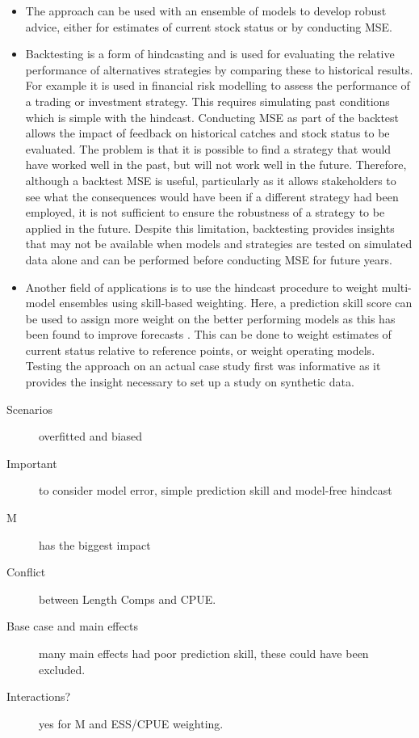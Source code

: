 \begin{itemize}
    \item The approach can be used with an ensemble of models to develop robust advice, either for estimates of current stock status or by conducting MSE. 
    \item Backtesting is a form of hindcasting and is used for evaluating the relative performance of alternatives strategies by comparing these to historical results. For example it is used in financial risk modelling to assess the performance of a trading or investment strategy. This requires simulating past conditions which is simple with the hindcast. Conducting MSE as part of the backtest allows the impact of feedback on historical catches and stock status to be evaluated. The problem is that it is possible to find a strategy that would have worked well in the past, but will not work well in the future. Therefore, although a backtest MSE is useful, particularly as it allows stakeholders to see what the consequences would have been if a different strategy had been employed, it is not sufficient to ensure the robustness of a strategy to be applied in the future. Despite this limitation, backtesting provides insights that may not be available when models and strategies are tested on simulated data alone and can be performed before conducting MSE for future years.
    \item Another field of applications is to use the hindcast procedure to weight multi-model ensembles using skill-based weighting. Here, a prediction skill score can be used to assign more weight on the better performing models as this has been found to improve forecasts \parencite[e.g.][]{casanova2009weighting}. This can be done to weight estimates of current status relative to reference points, or weight operating models. Testing the approach on an actual case study first was informative as it provides the insight necessary to set up a study on synthetic data.
\end{itemize}

 \begin{description}
   \item[Scenarios] overfitted and biased
   \item[Important] to consider model error, simple prediction skill and model-free hindcast
   \item[M] has the biggest impact
   \item[Conflict] between Length Comps and CPUE.
   \item[Base case and main effects] many main effects had poor prediction skill, these could have been excluded. 
   \item[Interactions?] yes for M and ESS/CPUE weighting.
\end{description}
   
